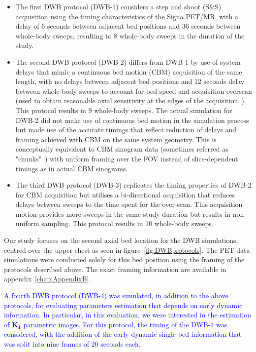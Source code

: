 \begin{itemize}
\item The first DWB protocol (DWB-1) considers a step and shoot (S\&S) acquisition using the timing characteristics of the Signa PET/MR, with a delay of 6 seconds between adjacent bed positions and 36 seconds between whole-body sweeps, resulting to 8 whole-body sweeps in the duration of the study. \\

\item The second DWB protocol (DWB-2) differs from DWB-1 by use of system delays that mimic a continuous bed motion (CBM) acquisition of the same length, with no delays between adjacent bed positions and 12 seconds delay between whole-body sweeps to account for bed speed and acquisition overscan (used to obtain reasonable axial sensitivity at the edges of the acquisition~\cite{Panin2014}). This protocol results in 9 whole-body sweeps. The actual simulation for DWB-2 did not make use of continuous bed motion in the simulation process but made use of the accurate timings that reflect reduction of delays and framing achieved with CBM on the same system geometry. This is conceptually equivalent to CBM sinogram data (sometimes referred as "chunks"~\cite{Hu2014}) with uniform framing over the FOV instead of slice-dependent timings as in actual CBM sinograms. \\

\item The third DWB protocol (DWB-3) replicates the timing properties of DWB-2 for CBM acquisition but utilises a bi-directional acquisition that reduces delays between sweeps to the time spent for the over-scan. This acquisition motion provides more sweeps in the same study duration but results in non-uniform sampling. This protocol results in 10 whole-body sweeps.
\end{itemize}
\noindent 
Our study focuses on the second axial bed location for the DWB simulations, centred over the upper chest as seen in figure~\ref{fig:DWBprotocols}.
The PET data simulations were conducted solely for this bed position using the framing of the protocols described above. The exact framing information are available in appendix~\ref{chap:AppendixB}.%

\textcolor{blue}{
A fourth DWB protocol (DWB-4) was simulated, in addition to the above protocols, for evaluating parameters estimation that depends on early dynamic information. In particular, in this evaluation, we were interested in the estimation of $\boldsymbol{K_1}$ parametric images. For this protocol, the timing of the DWB-1 was considered, with the addition of the early dynamic single bed information that was split into nine frames of 20 seconds each.}


